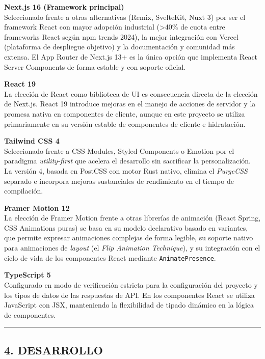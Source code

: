 \documentclass[
]{article}
\begin{document}
\textbf{Next.js 16 (Framework principal)}\\
Seleccionado frente a otras alternativas (Remix, SvelteKit, Nuxt 3) por
ser el framework React con mayor adopción industrial (\textgreater40\%
de cuota entre frameworks React según npm trends 2024), la mejor
integración con Vercel (plataforma de despliegue objetivo) y la
documentación y comunidad más extensa. El App Router de Next.js 13+ es
la única opción que implementa React Server Components de forma estable
y con soporte oficial.

\textbf{React 19}\\
La elección de React como biblioteca de UI es consecuencia directa de la
elección de Next.js. React 19 introduce mejoras en el manejo de acciones
de servidor y la promesa nativa en componentes de cliente, aunque en
este proyecto se utiliza primariamente en su versión estable de
componentes de cliente e hidratación.

\textbf{Tailwind CSS 4}\\
Seleccionado frente a CSS Modules, Styled Components o Emotion por el
paradigma \emph{utility-first} que acelera el desarrollo sin sacrificar
la personalización. La versión 4, basada en PostCSS con motor Rust
nativo, elimina el \emph{PurgeCSS} separado e incorpora mejoras
sustanciales de rendimiento en el tiempo de compilación.

\textbf{Framer Motion 12}\\
La elección de Framer Motion frente a otras librerías de animación
(React Spring, CSS Animations puras) se basa en su modelo declarativo
basado en variantes, que permite expresar animaciones complejas de forma
legible, su soporte nativo para animaciones de \emph{layout} (el
\emph{Flip Animation Technique}), y su integración con el ciclo de vida
de los componentes React mediante \texttt{AnimatePresence}.

\textbf{TypeScript 5}\\
Configurado en modo de verificación estricta para la configuración del
proyecto y los tipos de datos de las respuestas de API. En los
componentes React se utiliza JavaScript con JSX, manteniendo la
flexibilidad de tipado dinámico en la lógica de componentes.

\begin{center}\rule{0.5\linewidth}{0.5pt}\end{center}

\hypertarget{desarrollo}{%
\subsection{4. DESARROLLO}\label{desarrollo}}
\end{document}

